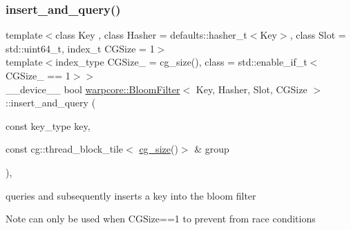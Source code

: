 \subsubsection{\texorpdfstring{insert\+\_\+and\+\_\+query()}{insert\_and\_query()}}
{\footnotesize\ttfamily template$<$class Key , class Hasher  = defaults\+::hasher\+\_\+t$<$\+Key$>$, class Slot  = std\+::uint64\+\_\+t, index\+\_\+t C\+G\+Size = 1$>$ \\
template$<$index\+\_\+type C\+G\+Size\+\_\+ = cg\+\_\+size(), class  = std\+::enable\+\_\+if\+\_\+t$<$\+C\+G\+Size\+\_\+ == 1$>$$>$ \\
\+\_\+\+\_\+device\+\_\+\+\_\+ bool \hyperlink{classwarpcore_1_1BloomFilter}{warpcore\+::\+Bloom\+Filter}$<$ Key, Hasher, Slot, C\+G\+Size $>$\+::insert\+\_\+and\+\_\+query (\begin{DoxyParamCaption}\item[{const key\+\_\+type}]{key,  }\item[{const cg\+::thread\+\_\+block\+\_\+tile$<$ \hyperlink{classwarpcore_1_1BloomFilter_a6ad2335811852ad62fc65e85416d3904}{cg\+\_\+size}()$>$ \&}]{group }\end{DoxyParamCaption})\hspace{0.3cm}{\ttfamily [inline]}, {\ttfamily [noexcept]}}



queries and subsequently inserts a key into the bloom filter 

\begin{DoxyNote}{Note}
can only be used when {\ttfamily C\+G\+Size==1} to prevent from race conditions 
\end{DoxyNote}

